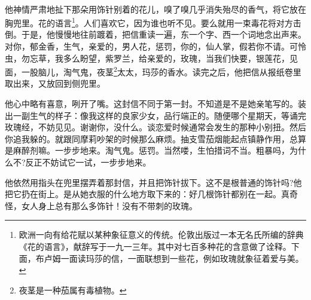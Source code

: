 \par 他神情严肃地扯下那朵用饰针别着的花儿，嗅了嗅几乎消失殆尽的香气，将它放在胸兜里。花的语言\footnote{欧洲一向有给花赋以某种象征意义的传统。伦敦出版过一本无名氏所编的辞典《花的语言》，献辞写于一九一三年。其中对七百多种花的含意做了诠释。下面，布卢姆一面读玛莎的信，一面联想到一些花，例如玫瑰就象征着爱与美。}。人们喜欢它，因为谁也听不见。要么就用一束毒花将对方击倒。于是，他慢慢地往前踱着，把信重读一遍，东一个字、西一个词地念出声来。对你，郁金香，生气，亲爱的，男人花，惩罚，你的，仙人掌，假若你不请。可怜虫，勿忘草，我多么盼望，紫罗兰，给亲爱的，玫瑰，当我们快要，银莲花，见面，一股脑儿，淘气鬼，夜茎\footnote{夜茎是一种茄属有毒植物。}太太，玛莎的香水。读完之后，他把信从报纸卷里取出来，又放回到侧兜里。
\par 他心中略有喜意，咧开了嘴。这封信不同于第一封。不知道是不是她亲笔写的。装出一副生气的样子：像我这样的良家少女，品行端正的。随便哪个星期天，等诵完玫瑰经，不妨见见。谢谢你，没什么。谈恋爱时候通常会发生的那种小别扭。然后你追我躲的。就跟同摩莉吵架的时候那么麻烦。抽支雪茄烟能起点镇静作用，总算是麻醉剂嘛。一步步地来。淘气鬼。惩罚。当然喽，生怕措词不当。粗暴吗，为什么不?反正不妨试它一试，一步步地来。
\par 他依然用指头在兜里摆弄着那封信，并且把饰针拔下。这不是根普通的饰针吗?他把它扔在街上。是从她衣服的什么地方取下来的：好几根饰针都别在一起。真奇怪，女人身上总有那么多饰针！没有不带刺的玫瑰。

